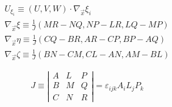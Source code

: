 \[\begin{array}{l}
{U_{{\xi _i}}} \equiv \left( {U,V,W} \right) \cdot {\nabla _{\vec x}}{\xi _i}\\
{\nabla _{\vec x}}\xi  \equiv \frac{1}{J}\left( {MR - NQ,NP - LR,LQ - MP} \right)\\
{\nabla _{\vec x}}\eta  \equiv \frac{1}{J}\left( {CQ - BR,AR - CP,BP - AQ} \right)\\
{\nabla _{\vec x}}\zeta  \equiv \frac{1}{J}\left( {BN - CM,CL - AN,AM - BL} \right)
\end{array}\]

\[J \equiv \left| {\begin{array}{*{20}{c}}
A&L&P\\
B&M&Q\\
C&N&R
\end{array}} \right| = {\varepsilon _{ijk}}{A_i}{L_j}{P_k}\]


